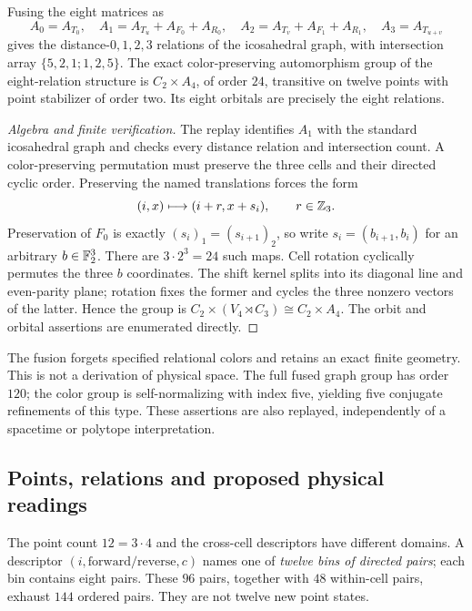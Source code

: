 \begin{proposition}\label{prop:fusion}
Fusing the eight matrices as
\begin{equation}
A_0=A_{T_0},\quad
A_1=A_{T_u}+A_{F_0}+A_{R_0},\quad
A_2=A_{T_v}+A_{F_1}+A_{R_1},\quad
A_3=A_{T_{u+v}}
\tag{K4}\label{eq:kernel-fusion}
\end{equation}
gives the distance-$0,1,2,3$ relations of the icosahedral graph, with intersection array $\{5,2,1;1,2,5\}$. The exact color-preserving automorphism group of the eight-relation structure is $C_2\times A_4$, of order $24$, transitive on twelve points with point stabilizer of order two. Its eight orbitals are precisely the eight relations.
\end{proposition}
\begin{proof}[Algebra and finite verification]
The replay identifies $A_1$ with the standard icosahedral graph and checks every distance relation and intersection count. A color-preserving permutation must preserve the three cells and their directed cyclic order. Preserving the named translations forces the form
\[
(i,x)\longmapsto(i+r,x+s_i),\qquad r\in\mathbb Z_3.
\]
Preservation of $F_0$ is exactly $(s_i)_1=(s_{i+1})_2$, so write $s_i=(b_{i+1},b_i)$ for an arbitrary $b\in\mathbb F_2^3$. There are $3\cdot 2^3=24$ such maps. Cell rotation cyclically permutes the three $b$ coordinates. The shift kernel splits into its diagonal line and even-parity plane; rotation fixes the former and cycles the three nonzero vectors of the latter. Hence the group is $C_2\times(V_4\rtimes C_3)\cong C_2\times A_4$. The orbit and orbital assertions are enumerated directly.
\end{proof}

The fusion forgets specified relational colors and retains an exact finite geometry. This is not a derivation of physical space. The full fused graph group has order $120$; the color group is self-normalizing with index five, yielding five conjugate refinements of this type. These assertions are also replayed, independently of a spacetime or polytope interpretation.

\subsection*{Points, relations and proposed physical readings}
The point count $12=3\cdot4$ and the cross-cell descriptors have different domains. A descriptor $(i,\text{forward/reverse},c)$ names one of \emph{twelve bins of directed pairs}; each bin contains eight pairs. These $96$ pairs, together with $48$ within-cell pairs, exhaust $144$ ordered pairs. They are not twelve new point states.

